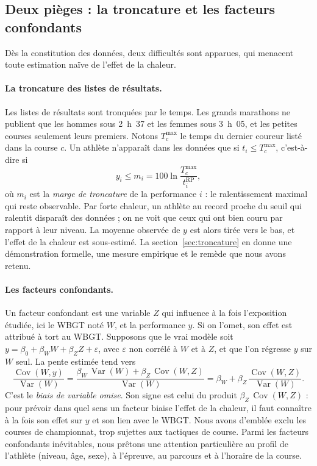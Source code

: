 \documentclass[11pt,a4paper]{article}
\DeclareMathOperator{\Var}{Var}
\DeclareMathOperator{\Cov}{Cov}
\newcommand{\RP}{\mathrm{RP}}
\begin{document}
\subsection{Deux pièges : la troncature et les facteurs confondants}\label{sec:pieges}

Dès la constitution des données, deux difficultés sont apparues, qui menacent toute estimation naïve de l'effet de
la chaleur.

\paragraph{La troncature des listes de résultats.} Les listes de résultats sont tronquées par le temps. Les grands
marathons ne publient que les hommes sous 2~h~37 et les femmes sous 3~h~05, et les petites courses seulement leurs
premiers. Notons $T^{\max}_c$ le temps du dernier coureur listé dans la course $c$. Un athlète n'apparaît dans les
données que si $t_i \le T^{\max}_c$, c'est-à-dire si
\[
y_i \leq m_i = 100 \ln \frac{T_c^{\max}}{t_i^{\RP}} ,
\]
où $m_i$ est la \emph{marge de troncature} de la performance $i$ : le ralentissement maximal qui reste observable.
Par forte chaleur, un athlète au record proche du seuil qui ralentit disparaît des données ; on ne voit que ceux qui
ont bien couru par rapport à leur niveau. La moyenne observée de $y$ est alors tirée vers le bas, et l'effet de la
chaleur est sous-estimé. La section~\ref{sec:troncature} en donne une démonstration formelle, une mesure empirique et
le remède que nous avons retenu.

\paragraph{Les facteurs confondants.} Un facteur confondant est une variable $Z$ qui influence à la fois l'exposition
étudiée, ici le WBGT noté $W$, et la performance $y$. Si on l'omet, son effet est attribué à tort au WBGT. Supposons
que le vrai modèle soit $y = \beta_0 + \beta_W W + \beta_Z Z + \varepsilon$, avec $\varepsilon$ non corrélé à $W$ et
à $Z$, et que l'on régresse $y$ sur $W$ seul. La pente estimée tend vers
\begin{equation}\label{eq:biais_omise}
\frac{\Cov(W, y)}{\Var(W)} = \frac{\beta_W\,\Var(W) + \beta_Z\,\Cov(W, Z)}{\Var(W)}
= \beta_W + \beta_Z\,\frac{\Cov(W, Z)}{\Var(W)} .
\end{equation}
C'est le \emph{biais de variable omise}. Son signe est celui du produit $\beta_Z\,\Cov(W, Z)$ : pour prévoir dans
quel sens un facteur biaise l'effet de la chaleur, il faut connaître à la fois son effet sur $y$ et son lien avec le
WBGT. Nous avons d'emblée exclu les courses de championnat, trop sujettes aux tactiques de course. Parmi les facteurs
confondants inévitables, nous prêtons une attention particulière au profil de l'athlète (niveau, âge, sexe), à
l'épreuve, au parcours et à l'horaire de la course.
\end{document}
